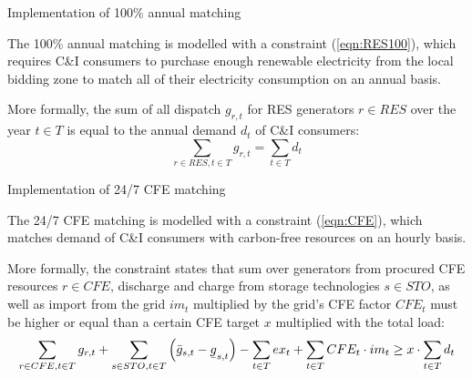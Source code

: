 \begin{frame}{Implementation of 100\% annual matching}

  {\small
  
The \alert{100\% annual matching} is modelled with a constraint (\ref{eqn:RES100}), which requires C\&I consumers 
to purchase enough renewable electricity from the local bidding zone to match all of their electricity consumption
on an annual basis.

\vspace{0.3cm}
More formally, the sum of all dispatch $g_{r,t}$ for RES generators $r\in RES$ over the year $t\in T$ 
is equal to the annual demand $d_t$ of C\&I consumers:
  \begin{equation}
    \sum_{r\in RES, t\in T} g_{r,t} = \sum_{t\in T} d_t
  \label{eqn:RES100}
  \end{equation}
  }
\end{frame}


\begin{frame}{Implementation of 24/7 CFE matching}

  {\small

  The \alert{24/7 CFE matching} is modelled with a constraint (\ref{eqn:CFE}), 
  which matches demand of C\&I consumers with carbon-free resources on an hourly basis. 

  More formally, the constraint states that sum over generators from procured CFE resources $r\in CFE$,
  discharge and charge from storage technologies $s\in STO$,
  as well as import from the grid $im_t$ multiplied by the grid's CFE factor $CFE_t$
  must be higher or equal than a certain CFE target $x$ multiplied with the total load:
  \vspace{0.1cm}
  \begin{equation}
  \sum_{r\in CFE, t\in T} g_{r,t} + \sum_{s\in STO, t\in T} \left(\bar{g}_{s,t} - \ubar{g}_{s,t}\right) - \sum_{t\in T} ex_t + \sum_{t\in T} CFE_t \cdot im_t \geq x \cdot \sum_{t\in T} d_t
  \label{eqn:CFE}
  \end{equation}
  \vspace{0.1cm}
  \noindent{}

  \noindent{}
  }

\end{frame}



